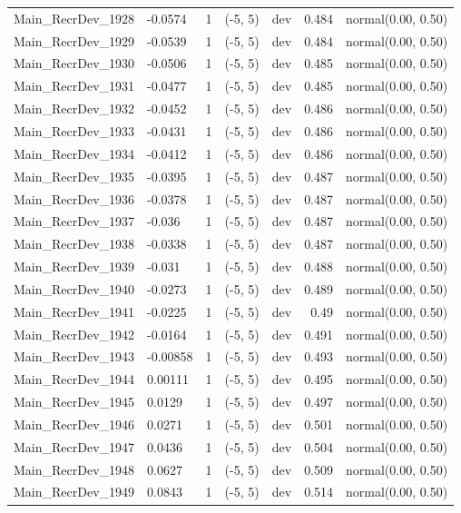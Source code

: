 \documentclass[
]{scrartcl}
\begin{document}
\begin{longtable}{llrllrl}
Main\_RecrDev\_1928 & -0.0574 & 1 & (-5, 5) & dev & 0.484 & normal(0.00, 0.50) \\ 
Main\_RecrDev\_1929 & -0.0539 & 1 & (-5, 5) & dev & 0.484 & normal(0.00, 0.50) \\ 
Main\_RecrDev\_1930 & -0.0506 & 1 & (-5, 5) & dev & 0.485 & normal(0.00, 0.50) \\ 
Main\_RecrDev\_1931 & -0.0477 & 1 & (-5, 5) & dev & 0.485 & normal(0.00, 0.50) \\ 
Main\_RecrDev\_1932 & -0.0452 & 1 & (-5, 5) & dev & 0.486 & normal(0.00, 0.50) \\ 
Main\_RecrDev\_1933 & -0.0431 & 1 & (-5, 5) & dev & 0.486 & normal(0.00, 0.50) \\ 
Main\_RecrDev\_1934 & -0.0412 & 1 & (-5, 5) & dev & 0.486 & normal(0.00, 0.50) \\ 
Main\_RecrDev\_1935 & -0.0395 & 1 & (-5, 5) & dev & 0.487 & normal(0.00, 0.50) \\ 
Main\_RecrDev\_1936 & -0.0378 & 1 & (-5, 5) & dev & 0.487 & normal(0.00, 0.50) \\ 
Main\_RecrDev\_1937 & -0.036 & 1 & (-5, 5) & dev & 0.487 & normal(0.00, 0.50) \\ 
Main\_RecrDev\_1938 & -0.0338 & 1 & (-5, 5) & dev & 0.487 & normal(0.00, 0.50) \\ 
Main\_RecrDev\_1939 & -0.031 & 1 & (-5, 5) & dev & 0.488 & normal(0.00, 0.50) \\ 
Main\_RecrDev\_1940 & -0.0273 & 1 & (-5, 5) & dev & 0.489 & normal(0.00, 0.50) \\ 
Main\_RecrDev\_1941 & -0.0225 & 1 & (-5, 5) & dev & 0.49 & normal(0.00, 0.50) \\ 
Main\_RecrDev\_1942 & -0.0164 & 1 & (-5, 5) & dev & 0.491 & normal(0.00, 0.50) \\ 
Main\_RecrDev\_1943 & -0.00858 & 1 & (-5, 5) & dev & 0.493 & normal(0.00, 0.50) \\ 
Main\_RecrDev\_1944 & 0.00111 & 1 & (-5, 5) & dev & 0.495 & normal(0.00, 0.50) \\ 
Main\_RecrDev\_1945 & 0.0129 & 1 & (-5, 5) & dev & 0.497 & normal(0.00, 0.50) \\ 
Main\_RecrDev\_1946 & 0.0271 & 1 & (-5, 5) & dev & 0.501 & normal(0.00, 0.50) \\ 
Main\_RecrDev\_1947 & 0.0436 & 1 & (-5, 5) & dev & 0.504 & normal(0.00, 0.50) \\ 
Main\_RecrDev\_1948 & 0.0627 & 1 & (-5, 5) & dev & 0.509 & normal(0.00, 0.50) \\ 
Main\_RecrDev\_1949 & 0.0843 & 1 & (-5, 5) & dev & 0.514 & normal(0.00, 0.50) \\ 

\end{longtable}
\end{document}
